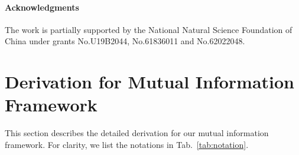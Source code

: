 \documentclass[10pt,twocolumn,letterpaper]{article}
\begin{document}
\paragraph{Acknowledgments} The work is partially supported by the National Natural Science Foundation of China under grants No.U19B2044, No.61836011 and No.62022048. 
{\small


}

\newpage
\appendix
\section{Derivation for Mutual Information Framework}
This section describes the detailed derivation for our mutual information framework. For clarity, we list the notations in Tab.~\ref{tab:notation}.
\setlength{\tabcolsep}{2pt}
\renewcommand{\arraystretch}{1.05}
\end{document}
